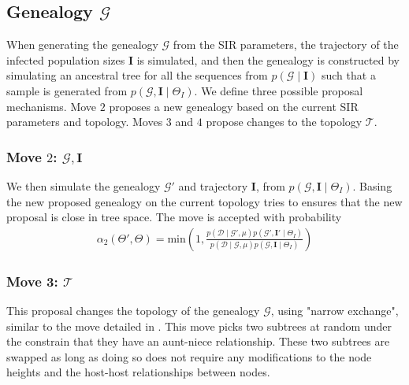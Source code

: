 \documentclass[a4paper,18pt]{report}
\begin{document}
\subsection{Genealogy $\mathcal{G}$} 

When generating the genealogy $\mathcal{G}$ from the SIR parameters, the trajectory of the infected population sizes $\mathbf{I}$ is simulated, and then the genealogy is constructed by simulating an ancestral tree for all the sequences from $p(\mathcal{G} \mid \mathbf{I})$  such that a sample is generated from $p(\mathcal{G}, \mathbf{I} \mid \Theta_{I})$.
We define three possible proposal mechanisms. Move $2$ proposes a new genealogy based on the current SIR parameters and topology. Moves $3$ and $4$ propose changes to the topology $\mathcal{T}$.

\subsubsection{Move $2$: $\mathcal{G}, \mathbf{I}$}
We then simulate the genealogy $\mathcal{G}'$ and trajectory $\mathbf{I}$, from  $p(\mathcal{G}, \mathbf{I} \mid \Theta_{I})$.  Basing the new proposed genealogy on the current topology tries to ensures that the new proposal is close in tree space. The move is accepted with probability 
\begin{eqnarray}
\alpha_{2}(\Theta',\Theta)=\textrm{min}\left(1,\frac{p(\mathcal{D}\mid \mathcal{G}', \mu) p(\mathcal{G}', \mathbf{I}' \mid \Theta_{I})}{p(\mathcal{D}\mid \mathcal{G}, \mu ) p(\mathcal{G}, \mathbf{I} \mid \Theta_{I})} \right)
\end{eqnarray}
\subsubsection{Move 3: $\mathcal{T}$}
This proposal changes the topology of the genealogy $\mathcal{G}$, using "narrow exchange", similar to the move detailed in \cite{Drummond:2002it}. This move picks two subtrees at random under the constrain that they have an aunt-niece relationship. These two subtrees are swapped as long as doing so does not require any modifications to the node heights and the host-host relationships between nodes. 
\end{document}
